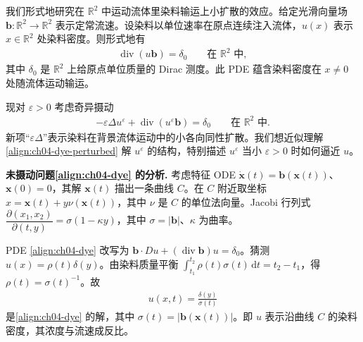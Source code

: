\documentclass[../../main.tex]{subfiles}
\begin{document}
\begin{example}[输运与小扩散]\label{example:ch04-singular-transport}我们形式地研究在 $\mathbb{R}^2$ 中运动流体里染料输运上小扩散的效应。给定光滑向量场 $\mathbf{b}:\mathbb{R}^2\to\mathbb{R}^2$ 表示定常流速。设染料以单位速率在原点连续注入流体，$u(x)$ 表示 $x\in\mathbb{R}^2$ 处染料密度。则形式地有
\begin{align}\label{align:ch04-dye}
\operatorname{div}(u\mathbf{b})=\delta_0 \qquad\text{在 }\mathbb{R}^2\text{ 中},
\end{align}
其中 $\delta_0$ 是 $\mathbb{R}^2$ 上给原点单位质量的 Dirac 测度。此 PDE 蕴含染料密度在 $x\neq 0$ 处随流体运动输运。

现对 $\varepsilon>0$ 考虑奇异摄动
\begin{align}\label{align:ch04-dye-perturbed}
-\varepsilon\Delta u^\varepsilon+\operatorname{div}(u^\varepsilon\mathbf{b})=\delta_0 \qquad\text{在 }\mathbb{R}^2\text{ 中}.
\end{align}
新项``$\varepsilon\Delta$''表示染料在背景流体运动中的小各向同性扩散。我们想近似理解\eqref{align:ch04-dye-perturbed} 解 $u^\varepsilon$ 的结构，特别描述 $u^\varepsilon$ 当小 $\varepsilon>0$ 时如何逼近 $u$。

\textbf{未摄动问题\eqref{align:ch04-dye} 的分析.} 考虑特征 ODE $\dot{\mathbf{x}}(t)=\mathbf{b}(\mathbf{x}(t))$、$\mathbf{x}(0)=0$，其解 $\mathbf{x}(t)$ 描出一条曲线 $C$。在 $C$ 附近取坐标 $x=\mathbf{x}(t)+y\nu(\mathbf{x}(t))$，其中 $\nu$ 是 $C$ 的单位法向量。Jacobi 行列式 $\dfrac{\partial(x_1,x_2)}{\partial(t,y)}=\sigma(1-\kappa y)$，其中 $\sigma=|\mathbf{b}|$、$\kappa$ 为曲率。

PDE \eqref{align:ch04-dye} 改写为 $\mathbf{b}\cdot Du+(\operatorname{div}\mathbf{b})u=\delta_0$。猜测 $u(x)=\rho(t)\delta(y)$。由染料质量平衡 $\int_{t_1}^{t_2}\rho(t)\sigma(t)\,\mathrm{d}t=t_2-t_1$，得 $\rho(t)=\sigma(t)^{-1}$。故
\begin{align}\label{align:ch04-dye-sol}
u(x,t)=\frac{\delta(y)}{\sigma(t)}
\end{align}
是\eqref{align:ch04-dye} 的解，其中 $\sigma(t)=|\mathbf{b}(\mathbf{x}(t))|$。即 $u$ 表示沿曲线 $C$ 的染料密度，其浓度与流速成反比。


\end{example}
\end{document}
